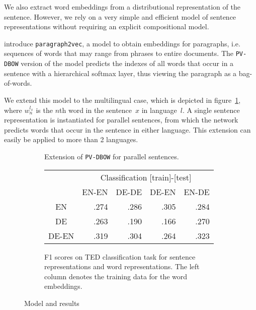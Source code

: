 \documentclass[a4paper,11pt]{article}
\begin{document}
We also extract word embeddings from a distributional representation of the sentence. However, we rely on a very simple and efficient model of sentence representations without requiring an explicit compositional model. 


\cite{le2014distributed} introduce {\tt paragraph2vec}, a model to obtain embeddings for paragraphs, i.e. sequences of words that may range from phrases  to entire documents. The {\tt PV-DBOW} version of the model predicts the indexes of all words that occur in a sentence with a hierarchical softmax layer, thus viewing the paragraph as a bag-of-words. 

We extend this model to the multilingual case, which is depicted in figure~\ref{f:model}, where $w_n^{l_x}$ is the $n$th word in the sentence~$x$ in language~$l$. A single sentence representation is instantiated for parallel sentences, from which the network predicts words that occur in the sentence in either language. This extension can easily be applied to more than 2 languages.%

\begin{figure}\center
\begin{subfigure}{.49\linewidth}
\center

\caption{Extension of {\tt PV-DBOW} for parallel sentences.}
\label{f:model}
\end{subfigure}
\begin{subfigure}{.49\linewidth}
\flushright
\begin{tabular}{c | r r r r }
&	\multicolumn{4}{c}{Classification [train]-[test]}	\\
&EN-EN	&DE-DE	&DE-EN	&EN-DE		\\\hline
EN			&.274		&.286		&.305		&.284		\\
DE			&.263		&.190		&.166		&.270		\\
DE-EN			&.319		&.304		&.264		&.323		\\
\end{tabular}
\caption{F1 scores on TED classification task for sentence representations and word representations. The left column denotes the training data	for	the word embeddings. }
\label{t:dbow_mono_bi}
\end{subfigure}
\caption{Model and results}
\end{figure}
\end{document}
